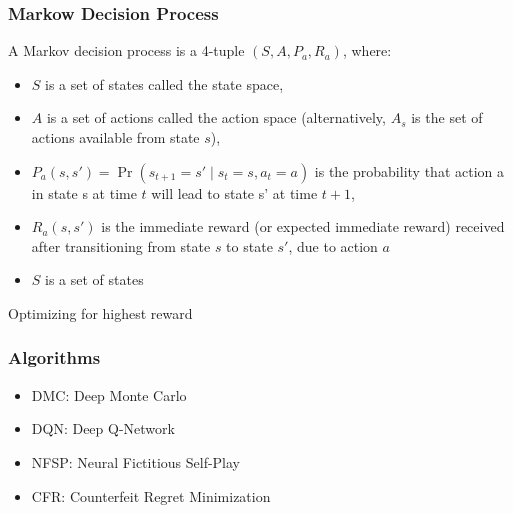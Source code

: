 \begin{frame}
    \frametitle{Markow Decision Process}
    A Markov decision process is a 4-tuple $(S,A,P_{a},R_{a})$, where:

    \begin{itemize}
        \item $S$ is a set of states called the state space,
        \item $A$ is a set of actions called the action space (alternatively, $A_s$ is the set of actions available from state $s$),
        \item $P_{a}(s,s')=\Pr(s_{t+1}=s'\mid s_{t}=s,a_{t}=a)$ is the probability that action a in state s at time $t$ will lead to state s' at time $t+1$,
        \item $R_{a}(s,s')$ is the immediate reward (or expected immediate reward) received after transitioning from state $s$ to state $s'$, due to action $a$
        \item $S$ is a set of states
    \end{itemize}

    Optimizing for highest reward

\end{frame}

\begin{frame}
    \frametitle{Algorithms}

    \begin{itemize}
        \item DMC: Deep Monte Carlo
        \item DQN: Deep Q-Network
        \item NFSP: Neural Fictitious Self-Play
        \item CFR: Counterfeit Regret Minimization
    \end{itemize}
\end{frame}
